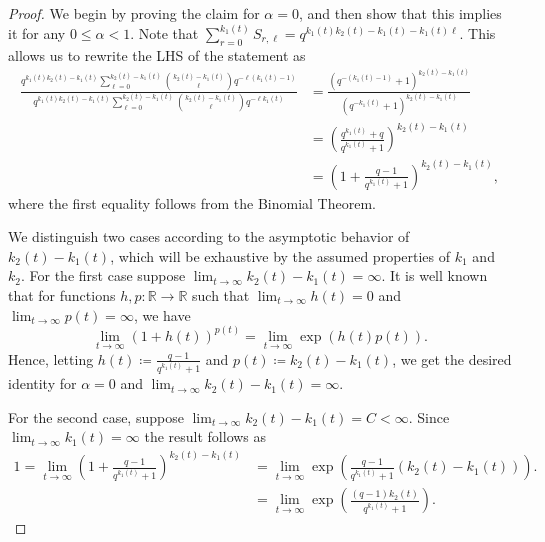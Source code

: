 \documentclass[a4paper,11pt,reqno]{article}
\theoremstyle{plain} \numberwithin{equation}{section}
\theoremstyle{definition}
\begin{document}
\begin{proof}
We begin by proving the claim for $\alpha = 0$, and then show that this implies it for any $0 \le \alpha <1$. Note that $\sum_{r=0}^{k_1(t)} S_{r,\ell} = q^{k_1(t)k_2(t) - k_1(t) - k_1(t)\ell}$. This allows us to rewrite the LHS of the statement as
    \begin{align*}
       \frac{q^{k_1(t) k_2(t) - k_1(t)}\sum_{\ell = 0}^{k_2(t)-k_1(t)} \binom{k_2(t)-k_1(t)}{\ell}q^{-\ell(k_1(t)-1)}}{q^{k_1(t)k_2(t)-k_1(t)}\sum_{\ell=0}^{k_2(t)-k_1(t)}\binom{k_2(t)-k_1(t)}{\ell}q^{-\ell k_1(t)}} &= \frac{(q^{-(k_1(t)-1)} +1)^{k_2(t)-k_1(t)}}{(q^{-k_1(t)} + 1)^{k_2(t)-k_1(t)}}\\
                &= \left(\frac{q^{k_1(t)} +q}{q^{k_1(t)}+1}\right)^{k_2(t)-k_1(t)}\\
                &= \left(1 + \frac{q-1}{q^{k_1(t)}+1}\right)^{k_2(t)-k_1(t)}, 
    \end{align*}
where the first equality follows from the Binomial Theorem. 


We distinguish two cases according to the asymptotic behavior of $k_2(t)-k_1(t)$, which will be exhaustive by the assumed properties of $k_1$ and $k_2$. For the first case suppose $\lim_{t \rightarrow \infty} k_2(t) - k_1(t) =\infty$. It is well known that for functions $h,p\colon \mathbb{R}\rightarrow \mathbb{R}$ such that $\lim_{t \rightarrow \infty} h(t) = 0$ and $\lim_{t \rightarrow \infty} p(t) = \infty$, we have $$\lim_{t \rightarrow \infty}(1+h(t))^{p(t)} = \lim_{t \rightarrow \infty} \exp({h(t)p(t)}).$$
Hence, letting $h(t) \coloneqq  \frac{q-1}{q^{k_1(t)}+1}$ and $p(t) \coloneqq k_2(t)-k_1(t)$, 
we get the desired identity for $\alpha = 0$ and $\lim_{t \rightarrow \infty} k_2(t) - k_1(t) =\infty$.


For the second case, suppose $\lim_{t \rightarrow \infty} k_2(t) - k_1(t) = C < \infty.$ Since $\lim_{t \rightarrow \infty} k_1(t) = \infty$ the result follows as
\begin{align*}
    1= \lim_{t \rightarrow \infty} \left(1 + \frac{q-1}{q^{k_1(t)}+1}\right)^{k_2(t)-k_1(t)} &=  \lim_{t \rightarrow \infty} \exp\left({\frac{q-1}{q^{k_1(t)}+1}(k_2(t)-k_1(t))}\right). \\
    &=  \lim_{t \rightarrow \infty} \exp\left({\frac{(q-1)k_2(t)}{q^{k_1(t)}+1}}\right).
\end{align*}


\end{proof}
\end{document}
